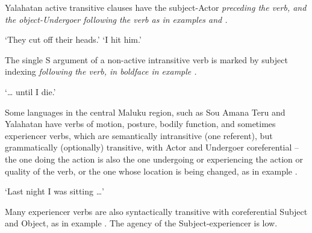 Yalahatan active transitive clauses have the subject-Actor \it{preceding}
the verb, and the object-Undergoer \it{following}
the verb as in examples  and .

\begin{exe}
\setcounter{xnumi}{4}
			\glt	‘They cut off their heads.’
						\label{ex:07-05}
			\glt	‘I hit him.’
						\label{ex:07-06}
\end{exe}

The single S argument of a non-active intransitive verb is marked
by subject indexing \it{following} the verb,
in boldface in example .

\begin{exe}
			\glt	‘{\ldots} until I die.’
						\label{ex:07-07}
\end{exe}

Some languages in the central Maluku region,
such as Sou Amana Teru \citep{Musgrave2010}
and Yalahatan have verbs of motion,
posture, bodily function, and sometimes experiencer verbs,
which are semantically intransitive (one referent),
but grammatically (optionally) transitive,
with Actor and Undergoer coreferential -- the one doing the action
is also the one undergoing or experiencing the action or quality
of the verb, or the one whose location is being changed,
as in example .

\begin{exe}
			\glt	‘Last night I was sitting {\ldots}’
						\label{ex:07-08}
\end{exe}

Many experiencer verbs are also syntactically transitive with
coreferential Subject and Object, as in example .
The agency of the Subject-experiencer is low.


